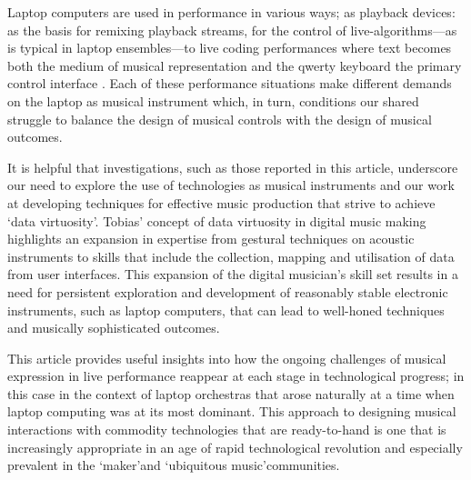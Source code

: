 Laptop computers are used in performance in various ways; as playback devices: as the basis for remixing playback streams, for the control of live-algorithms---as is typical in laptop ensembles---to live coding performances where text becomes both the medium of musical representation and the qwerty keyboard the primary control interface \cite{Brown:2006}. Each of these performance situations make different demands on the laptop as musical instrument which, in turn, conditions our shared struggle to balance the design of musical controls with the design of musical outcomes.

It is helpful that investigations, such as those reported in this article, underscore our need to explore the use of technologies as musical instruments and our work at developing techniques for effective music production that strive to achieve \lq data virtuosity\rq \cite{Tobias:2012}. Tobias' concept of data virtuosity in digital music making highlights an expansion in expertise from gestural techniques on acoustic instruments to skills that include the collection, mapping and utilisation of data from user interfaces. This expansion of the digital musician's skill set results in a need for persistent exploration and development of reasonably stable electronic instruments, such as laptop computers, that can lead to well-honed techniques and musically sophisticated outcomes.

This article provides useful insights into how the ongoing challenges of musical expression in live performance reappear at each stage in technological progress; in this case in the context of laptop orchestras that arose naturally at a time when laptop computing was at its most dominant. This approach to designing musical interactions with commodity technologies that are ready-to-hand is one that is increasingly appropriate in an age of rapid technological revolution and especially prevalent in the \lq maker\rq and \lq ubiquitous music\rq communities.
